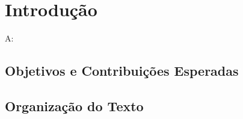 \chapter{Introdução}
\label{chap:introducao}



A: \cite{bilmes1997optimizing}

\section{Objetivos e Contribuições Esperadas}
\label{sec:contribucoes}

\section{Organização do Texto}
\label{sec:org}
